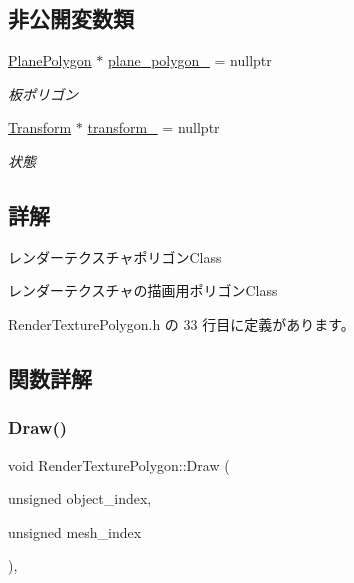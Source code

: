 \subsection*{非公開変数類}
\begin{DoxyCompactItemize}
\item 
\mbox{\hyperlink{class_plane_polygon}{Plane\+Polygon}} $\ast$ \mbox{\hyperlink{class_render_texture_polygon_abf107a1f67b8009ec2a039b044067576}{plane\+\_\+polygon\+\_\+}} = nullptr
\begin{DoxyCompactList}\small\item\em 板ポリゴン \end{DoxyCompactList}\item 
\mbox{\hyperlink{class_transform}{Transform}} $\ast$ \mbox{\hyperlink{class_render_texture_polygon_a6dab60101effeb8a36af342f53cd93e8}{transform\+\_\+}} = nullptr
\begin{DoxyCompactList}\small\item\em 状態 \end{DoxyCompactList}\end{DoxyCompactItemize}


\subsection{詳解}
レンダーテクスチャポリゴン\+Class 

レンダーテクスチャの描画用ポリゴン\+Class 

 Render\+Texture\+Polygon.\+h の 33 行目に定義があります。



\subsection{関数詳解}
\mbox{\label{class_render_texture_polygon_a95e688cae107312649c1fb7965e2ba6b}} 
\subsubsection{\texorpdfstring{Draw()}{Draw()}}
{\footnotesize\ttfamily void Render\+Texture\+Polygon\+::\+Draw (\begin{DoxyParamCaption}\item[{unsigned}]{object\+\_\+index,  }\item[{unsigned}]{mesh\+\_\+index }\end{DoxyParamCaption})\hspace{0.3cm}{\ttfamily [override]}, {\ttfamily [virtual]}}




